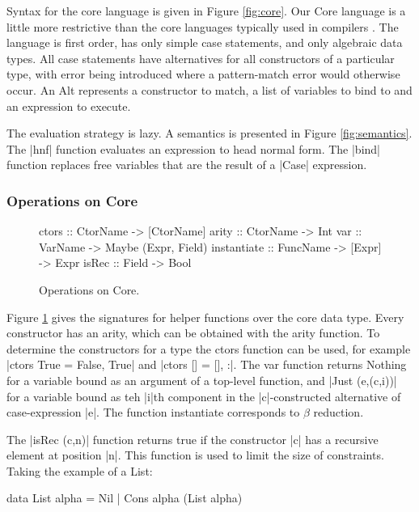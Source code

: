 \documentclass[preprint]{sigplanconf}
\newcommand{\C}[1]{\textsf{#1}}
\begin{document}
Syntax for the core language is given in Figure \ref{fig:core}. Our Core language is a little more restrictive than the core languages typically used in compilers \citep{ghc_core}. The language is first order, has only simple case statements, and only algebraic data types. All case statements have alternatives for all constructors of a particular type, with error being introduced where a pattern-match error would otherwise occur. An \C{Alt} represents a constructor to match, a list of variables to bind to and an expression to execute.

The evaluation strategy is lazy. A semantics is presented in Figure \ref{fig:semantics}. The |hnf| function evaluates an expression to head normal form. The |bind| function replaces free variables that are the result of a |Case| expression.

\subsubsection{Operations on Core}

\begin{figure}
\begin{code}
ctors        :: CtorName  -> [CtorName]
arity        :: CtorName  -> Int
var          :: VarName   -> Maybe (Expr, Field)
instantiate  :: FuncName  -> [Expr] -> Expr
isRec        :: Field     -> Bool
\end{code}
\caption{Operations on Core.}
\label{fig:core_operations}
\end{figure}

Figure \ref{fig:core_operations} gives the signatures for helper functions over the core data type. Every constructor has an arity, which can be obtained with the \C{arity} function. To determine the constructors for a type the \C{ctors} function can be used, for example |ctors True = {False, True}| and |ctors [] = {[], :}|. The \C{var} function returns \C{Nothing} for a variable bound as an argument of a top-level function, and |Just (e,(c,i))| for a variable bound as teh |i|th component in the |c|-constructed alternative of case-expression |e|. The function \C{instantiate} corresponds to $\beta$ reduction.

The |isRec (c,n)| function returns true if the constructor |c| has a recursive element at position |n|. This function is used to limit the size of constraints. Taking the example of a \C{List}:

\begin{code}
data List alpha = Nil | Cons alpha (List alpha)
\end{code}
\end{document}

